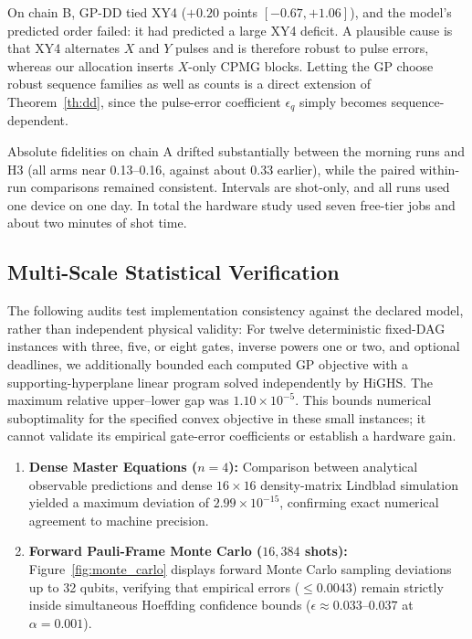 \documentclass[10pt,letterpaper,journal]{IEEEtran}
\begin{document}
On chain B, GP-DD tied XY4 ($+0.20$ points $[-0.67,+1.06]$), and the model's predicted order failed: it had predicted a large XY4 deficit. A plausible cause is that XY4 alternates $X$ and $Y$ pulses and is therefore robust to pulse errors, whereas our allocation inserts $X$-only CPMG blocks. Letting the GP choose robust sequence families as well as counts \cite{ezzell,tong2024,rahman2024} is a direct extension of Theorem~\ref{th:dd}, since the pulse-error coefficient $\epsilon_q$ simply becomes sequence-dependent.

Absolute fidelities on chain A drifted substantially between the morning runs and H3 (all arms near 0.13--0.16, against about 0.33 earlier), while the paired within-run comparisons remained consistent. Intervals are shot-only, and all runs used one device on one day. In total the hardware study used seven free-tier jobs and about two minutes of shot time.



\subsection{Multi-Scale Statistical Verification}
The following audits test implementation consistency against the declared model, rather than independent physical validity:
For twelve deterministic fixed-DAG instances with three, five, or eight gates, inverse powers one or two, and optional deadlines, we additionally bounded each computed GP objective with a supporting-hyperplane linear program solved independently by HiGHS. The maximum relative upper--lower gap was $1.10\times10^{-5}$. This bounds numerical suboptimality for the specified convex objective in these small instances; it cannot validate its empirical gate-error coefficients or establish a hardware gain.
\begin{enumerate}
\item \textbf{Dense Master Equations ($n=4$):} Comparison between analytical observable predictions and dense $16 \times 16$ density-matrix Lindblad simulation yielded a maximum deviation of $2.99 \times 10^{-15}$, confirming exact numerical agreement to machine precision.
\item \textbf{Forward Pauli-Frame Monte Carlo ($16{,}384$ shots):} Figure~\ref{fig:monte_carlo} displays forward Monte Carlo sampling deviations up to 32 qubits, verifying that empirical errors ($\le 0.0043$) remain strictly inside simultaneous Hoeffding confidence bounds ($\epsilon \approx 0.033\text{--}0.037$ at $\alpha = 0.001$).
\end{enumerate}
\end{document}
